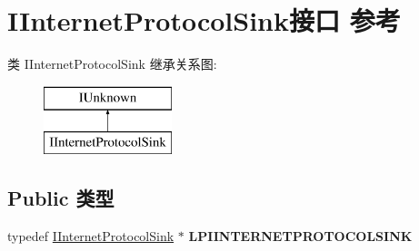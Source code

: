 \hypertarget{interface_i_internet_protocol_sink}{}\section{I\+Internet\+Protocol\+Sink接口 参考}
\label{interface_i_internet_protocol_sink}
类 I\+Internet\+Protocol\+Sink 继承关系图\+:\begin{figure}[H]
\begin{center}
\leavevmode
\includegraphics[height=2.000000cm]{interface_i_internet_protocol_sink}
\end{center}
\end{figure}
\subsection*{Public 类型}
\begin{DoxyCompactItemize}
\item 
\mbox{\label{interface_i_internet_protocol_sink_a539b4c4b33bdfa3141a7f6636be774fa}} 
typedef \hyperlink{interface_i_internet_protocol_sink}{I\+Internet\+Protocol\+Sink} $\ast$ {\bfseries L\+P\+I\+I\+N\+T\+E\+R\+N\+E\+T\+P\+R\+O\+T\+O\+C\+O\+L\+S\+I\+NK}
\end{DoxyCompactItemize}
